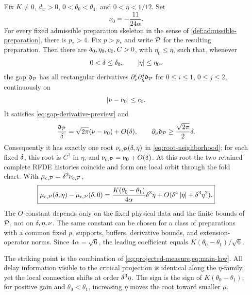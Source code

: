 \begin{theorem}
\label{thm:main}
Fix \(K\ne0\), \(d_w>0\), \(0<\theta_0<\theta_1\), and
\(0<\bar\eta<1/12\).  Set
\[
 \nu_0=-\frac{11}{24\alpha}.
\]
For every fixed admissible preparation skeleton in the sense of
\cref{def:admissible-preparation}, there is \(p_*>4\).
Fix \(p>p_*\) and write \(\mathcal P\) for the resulting preparation.  Then there
are \(\delta_0,\eta_0,c_0,C>0\), with \(\eta_0\le\bar\eta\), such that,
whenever
\[
 0<\delta\le\delta_0,\qquad \left\lvert \eta\right\rvert\le\eta_0,
\]
the gap \(\mathfrak d_\mathcal P\) has all rectangular derivatives
\(\partial_\nu^i\partial_\eta^j\mathfrak d_\mathcal P\) for
\(0\le i\le1\), \(0\le j\le2\), continuously on
\begin{equation}
\label{eq:root-neighborhood}
 \left\lvert \nu-\nu_0\right\rvert\le c_0.
\end{equation}
It satisfies \cref{eq:gap-derivative-preview} and
\[
 \frac{\mathfrak d_\mathcal P}{\delta}
 =\sqrt{2\pi}(\nu-\nu_0)+O(\delta),\qquad
 \partial_\nu\mathfrak d_\mathcal P\ge\frac{\sqrt{2\pi}}2\delta.
\]
Consequently it has exactly one root
\(\nu_{c,\mathcal P}(\delta,\eta)\) in \cref{eq:root-neighborhood};
for each fixed \(\delta\), this root is \(C^1\) in \(\eta\), and
\(\nu_{c,\mathcal P}=\nu_0+O(\delta)\).
At this root the two retained complete RFDE histories coincide and form one
local orbit through the fold chart.  With
\(\mu_{c,\mathcal P}=\delta^2\nu_{c,\mathcal P}\),
\begin{equation}
\label{eq:main-law}
\boxed{
 \mu_{c,\mathcal P}(\delta,\eta)-\mu_{c,\mathcal P}(\delta,0)
 =\frac{K(\theta_0-\theta_1)}{4\alpha}\delta^3\eta
  +O(\delta^4\left\lvert \eta\right\rvert+\delta^3\eta^2).}
\end{equation}
The \(O\)-constant depends only on the fixed physical data and the finite
bounds of \(\mathcal P\), not on \(\delta,\eta,\nu\).  The same constant can be
chosen for a class of preparations with a common fixed \(p\), supports,
buffers, derivative bounds, and extension-operator norms.  Since
\(4\alpha=\sqrt6\), the leading
coefficient equals \(K(\theta_0-\theta_1)/\sqrt6\).
\end{theorem}

The striking point is the combination of
\cref{eq:projected-measure,eq:main-law}.  All delay information visible to
the critical projection is identical along the \(\eta\)-family, yet the
local connection shifts at order \(\delta^3\eta\).  The sign is the sign of
\(K(\theta_0-\theta_1)\); for positive gain and
\(\theta_0<\theta_1\), increasing \(\eta\) moves the root toward smaller
\(\mu\).

